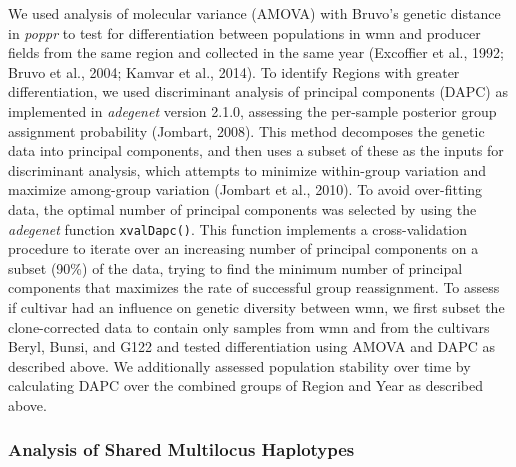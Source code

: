 \documentclass[fleqn,10pt,lineno]{wlpeerj} %
\theoremstyle{definition}
\theoremstyle{definition}
\theoremstyle{definition}
\theoremstyle{remark}
\begin{document}
We used analysis of molecular variance (AMOVA) with Bruvo's genetic
distance in \emph{poppr} to test for differentiation between populations
in wmn and producer fields from the same region and collected in the
same year (Excoffier et al., 1992; Bruvo et al., 2004; Kamvar et al.,
2014). To identify Regions with greater differentiation, we used
discriminant analysis of principal components (DAPC) as implemented in
\emph{adegenet} version 2.1.0, assessing the per-sample posterior group
assignment probability (Jombart, 2008). This method decomposes the
genetic data into principal components, and then uses a subset of these
as the inputs for discriminant analysis, which attempts to minimize
within-group variation and maximize among-group variation (Jombart et
al., 2010). To avoid over-fitting data, the optimal number of principal
components was selected by using the \emph{adegenet} function
\texttt{xvalDapc()}. This function implements a cross-validation
procedure to iterate over an increasing number of principal components
on a subset (90\%) of the data, trying to find the minimum number of
principal components that maximizes the rate of successful group
reassignment. To assess if cultivar had an influence on genetic
diversity between wmn, we first subset the clone-corrected data to
contain only samples from wmn and from the cultivars Beryl, Bunsi, and
G122 and tested differentiation using AMOVA and DAPC as described above.
We additionally assessed population stability over time by calculating
DAPC over the combined groups of Region and Year as described above.

\subsubsection*{Analysis of Shared Multilocus
Haplotypes}\label{analysis-of-shared-multilocus-haplotypes}
\end{document}
